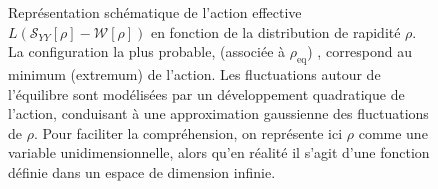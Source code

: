 \begin{figure}[H]
	\centering
	\caption{Représentation schématique de l’action effective $L(\mathcal{S}_{YY}[\rho] - \mathcal{W}[\rho])$ en fonction de la distribution de rapidité $\rho$. La configuration la plus probable, (associée à $\rho_{\mathrm{eq}}$) , correspond au minimum (extremum) de l’action. Les fluctuations autour de l’équilibre sont modélisées par un développement quadratique de l’action, conduisant à une approximation gaussienne des fluctuations de $\rho$. Pour faciliter la compréhension, on représente ici $\rho$ comme une variable unidimensionnelle, alors qu’en réalité il s’agit d’une fonction définie dans un espace de dimension infinie.}
	\label{fig:Act.gauss}
\end{figure}


%					
%
%
%
%
%					
%
%
%

